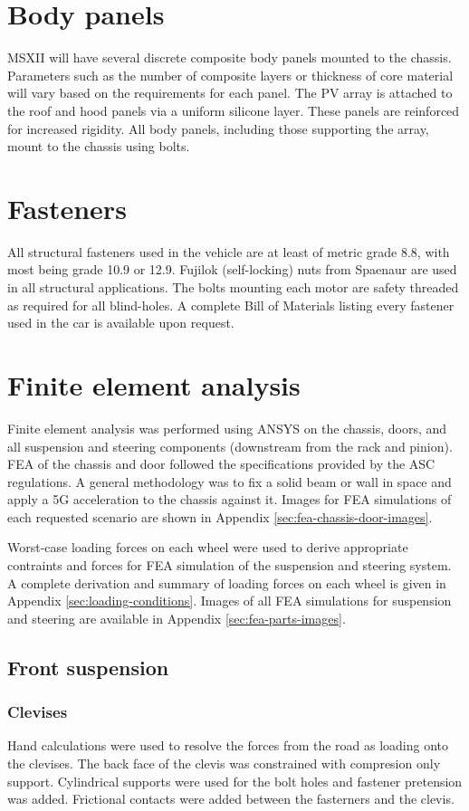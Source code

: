 \documentclass[10pt]{article}
\begin{document}
\section{Body panels}
MSXII will have several discrete composite body panels mounted to the chassis. Parameters such as the number of composite layers or thickness of core material will vary based on the requirements for each panel. The PV array is attached to the roof and hood panels via a uniform silicone layer. These panels are reinforced for increased rigidity. All body panels, including those supporting the array, mount to the chassis using bolts.

\section{Fasteners}
All structural fasteners used in the vehicle are at least of metric grade 8.8, with most being grade 10.9 or 12.9. Fujilok (self-locking) nuts from Spaenaur are used in all structural applications. The bolts mounting each motor are safety threaded as required for all blind-holes. A complete Bill of Materials listing every fastener used in the car is available upon request.

\section{Finite element analysis}
Finite element analysis was performed using ANSYS on the chassis, doors, and all suspension and steering components (downstream from the rack and pinion). FEA of the chassis and door followed the specifications provided by the ASC regulations. A general methodology was to fix a solid beam or wall in space and apply a 5G acceleration to the chassis against it. Images for FEA simulations of each requested scenario are shown in Appendix \ref{sec:fea-chassis-door-images}.

Worst-case loading forces on each wheel were used to derive appropriate contraints and forces for FEA simulation of the suspension and steering system. A complete derivation and summary of loading forces on each wheel is given in Appendix \ref{sec:loading-conditions}. Images of all FEA simulations for suspension and steering are available in Appendix \ref{sec:fea-parts-images}.

\subsection{Front suspension}
\subsubsection{Clevises}
Hand calculations were used to resolve the forces from the road as loading onto the clevises. The back face of the clevis was constrained with compresion only support. Cylindrical supports were used for the bolt holes and fastener pretension was added. Frictional contacts were added between the fasterners and the clevis.
\end{document}
